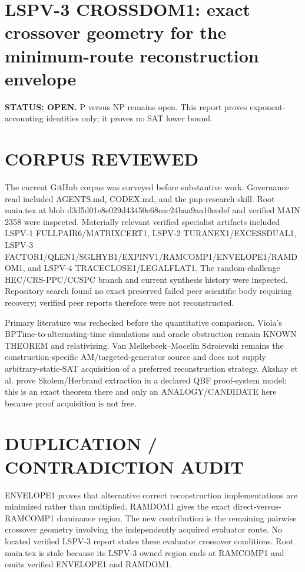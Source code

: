 \documentclass[11pt]{article}
\begin{document}
\section*{LSPV-3 CROSSDOM1: exact crossover geometry for the minimum-route reconstruction envelope}
\textbf{STATUS: OPEN.} P versus NP remains open. This report proves exponent-accounting identities only; it proves no SAT lower bound.

\section*{CORPUS REVIEWED}
The current GitHub corpus was surveyed before substantive work. Governance read included AGENTS.md, CODEX.md, and the pnp-research skill. Root main.tex at blob d3d5d01e8e029d43450e68eac24baa9aa10cedef and verified MAIN 2358 were inspected. Materially relevant verified specialist artifacts included LSPV-1 FULLPAIR6/MATRIXCERT1, LSPV-2 TURANEX1/EXCESSDUAL1, LSPV-3 FACTOR1/QLEN1/SGLHYB1/EXPINV1/RAMCOMP1/ENVELOPE1/RAMDOM1, and LSPV-4 TRACECLOSE1/LEGALFLAT1. The random-challenge HEC/CRS-PPC/CCSPC branch and current synthesis history were inspected. Repository search found no exact preserved failed peer scientific body requiring recovery; verified peer reports therefore were not reconstructed.

Primary literature was rechecked before the quantitative comparison. Viola's BPTime-to-alternating-time simulations and oracle obstruction remain KNOWN THEOREM and relativizing. Van Melkebeek--Mocelin Sdroievski remains the construction-specific AM/targeted-generator source and does not supply arbitrary-static-SAT acquisition of a preferred reconstruction strategy. Akshay et al. prove Skolem/Herbrand extraction in a declared QBF proof-system model; this is an exact theorem there and only an ANALOGY/CANDIDATE here because proof acquisition is not free.

\section*{DUPLICATION / CONTRADICTION AUDIT}
ENVELOPE1 proves that alternative correct reconstruction implementations are minimized rather than multiplied. RAMDOM1 gives the exact direct-versus-RAMCOMP1 dominance region. The new contribution is the remaining pairwise crossover geometry involving the independently acquired evaluator route. No located verified LSPV-3 report states these evaluator crossover conditions. Root main.tex is stale because its LSPV-3 owned region ends at RAMCOMP1 and omits verified ENVELOPE1 and RAMDOM1.
\end{document}
